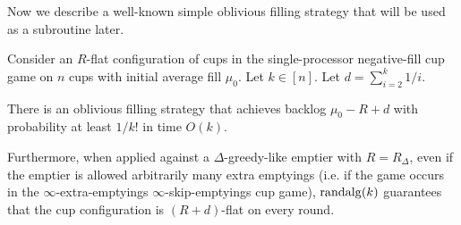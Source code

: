 Now we describe a well-known simple oblivious filling strategy
that will be used as a subroutine later.
\begin{proposition}
  \label{prop:TO_randalg} %
  Consider an $R$-flat configuration of cups in the
  single-processor negative-fill cup game on $n$ cups with
  initial average fill $\mu_0$. Let $k \in [n]$. Let $d =
  \sum_{i=2}^k 1/i.$

  There is an oblivious filling strategy 
  that achieves backlog $\mu_0 - R + d$ with
  probability at least $1/k!$ in time $O(k)$.

  Furthermore, when applied against a $\Delta$-greedy-like
  emptier with $R = R_\Delta$, even if the emptier is allowed
  arbitrarily many extra emptyings (i.e. if the game occurs in
  the $\infty$-extra-emptyings $\infty$-skip-emptyings cup game),
  $\operatorname{\text{\textup{randalg}}}(k)$ guarantees that the cup configuration is $(R +
  d)$-flat on every round.
\end{proposition}
